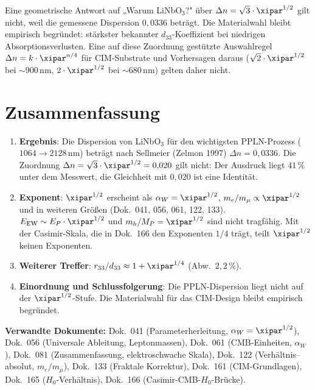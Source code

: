 Eine geometrische Antwort auf „Warum LiNbO$_3$?" über
$\Delta n = \sqrt{3}\cdot\xipar^{1/2}$ gilt nicht, weil die gemessene Dispersion
$0{,}0336$ beträgt. Die Materialwahl bleibt empirisch begründet: stärkster
bekannter $d_{33}$-Koeffizient bei niedrigen Absorptionsverlusten. Eine auf
diese Zuordnung gestützte Auswahlregel $\Delta n = k\cdot\xipar^{n/4}$ für
CIM-Substrate und Vorhersagen daraus ($\sqrt{2}\cdot\xipar^{1/2}$ bei
$\sim 900\,\text{nm}$, $2\cdot\xipar^{1/2}$ bei $\sim 680\,\text{nm}$) gelten daher nicht.

\clearpage

\section{Zusammenfassung}
\label{sec:zusammenfassung}

\begin{enumerate}

    \item \textbf{Ergebnis}: Die Dispersion von LiNbO$_3$ für den
    wichtigsten PPLN-Prozess ($1064 \to 2128\,\text{nm}$) beträgt nach
    Sellmeier (Zelmon 1997) $\Delta n = 0{,}0336$. Die Zuordnung
    $\Delta n = \sqrt{3}\cdot\xipar^{1/2} = 0{,}020$ gilt nicht: Der Ausdruck liegt
    $41\,\%$ unter dem Messwert, die Gleichheit mit $0{,}020$ ist eine Identität.

    \item \textbf{Exponent}: $\xipar^{1/2}$ erscheint als
    $\alpha_W = \xipar^{1/2}$, $m_e/m_\mu \propto \xipar^{1/2}$ und in weiteren
    Größen (Dok.~041, 056, 061, 122, 133). $E_\mathrm{EW} \sim E_P\cdot\xipar^{1/2}$
    und $m_h/M_P = \xipar^{1/2}$ sind nicht tragfähig. Mit der Casimir-Skala, die
    in Dok.~166 den Exponenten $1/4$ trägt, teilt $\xipar^{1/2}$ keinen Exponenten.

    \item \textbf{Weiterer Treffer}: $r_{33}/d_{33} \approx 1 + \xipar^{1/4}$
    (Abw.\ $2{,}2\,\%$).

    \item \textbf{Einordnung und Schlussfolgerung}: Die PPLN-Dispersion liegt
    nicht auf der $\xipar^{1/2}$-Stufe. Die Materialwahl für das CIM-Design bleibt
    empirisch begründet.

\end{enumerate}

\bigskip\bigskip

\noindent\textbf{Verwandte Dokumente:}
Dok.~041 (Parameterherleitung, $\alpha_W = \xipar^{1/2}$),
Dok.~056 (Universale Ableitung, Leptonmassen),
Dok.~061 (CMB-Einheiten, $\alpha_W$),
Dok.~081 (Zusammenfassung, elektroschwache Skala),
Dok.~122 (Verhältnis–absolut, $m_e/m_\mu$),
Dok.~133 (Fraktale Korrektur),
Dok.~161 (CIM-Grundlagen),
Dok.~165 ($H_0$-Verhältnis),
Dok.~166 (Casimir-CMB-$H_0$-Brücke).
